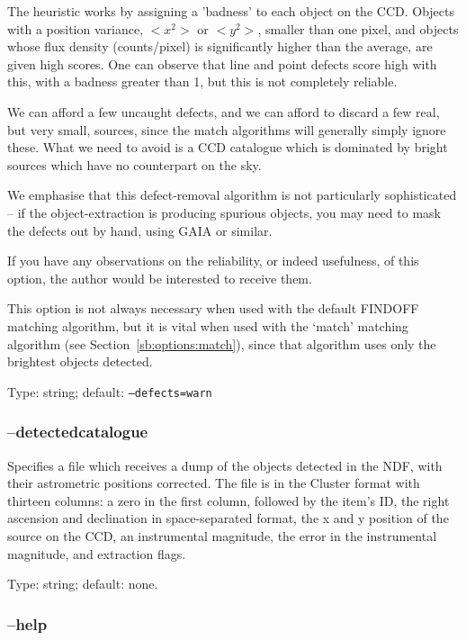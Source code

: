 \documentclass[twoside,11pt]{article}
\newcommand{\xlabel}[1]{}
\begin{document}
The heuristic works by assigning a 'badness' to each object on the CCD.
Objects with a position variance, $<x^2>$ or $<y^2>$, smaller than one pixel,
and objects whose flux density (counts/pixel) is significantly higher than the
average, are given high scores.  One can observe that line and point defects
score high with this, with a badness greater than 1, but this is not
completely reliable.

We can afford a few uncaught defects, and we can afford to discard a few real,
but very small, sources, since the match algorithms will generally simply
ignore these.  What we need to avoid is a CCD catalogue which is dominated by
bright sources which have no counterpart on the sky.

We emphasise that this defect-removal algorithm is not particularly
sophisticated -- if the object-extraction is producing spurious objects, you
may need to mask the defects out by hand, using GAIA or similar.

If you have any observations on the reliability, or indeed usefulness, of this
option, the author would be interested to receive them.

This option is not always necessary when used with the default FINDOFF
matching algorithm, but it is vital when used with the `match' matching
algorithm (see Section~\ref{sb:options:match}), since that algorithm uses only
the brightest objects detected.

Type: string; default: \texttt{--defects=warn}

\subsubsection{\xlabel{sb_options_detectedcatalogue}--detectedcatalogue\label{sb:options:detectedcatalogue}}

Specifies a file which receives a dump of the objects detected in the NDF,
with their astrometric positions corrected. The file is in the Cluster format
with thirteen columns: a zero in the first column, followed by the item's ID,
the right ascension and declination in space-separated format, the x and y
position of the source on the CCD, an instrumental magnitude, the error in the
instrumental magnitude, and extraction flags.

Type: string; default: none.

\subsubsection{\xlabel{sb_options_help}--help\label{sb:options:help}}
\end{document}
